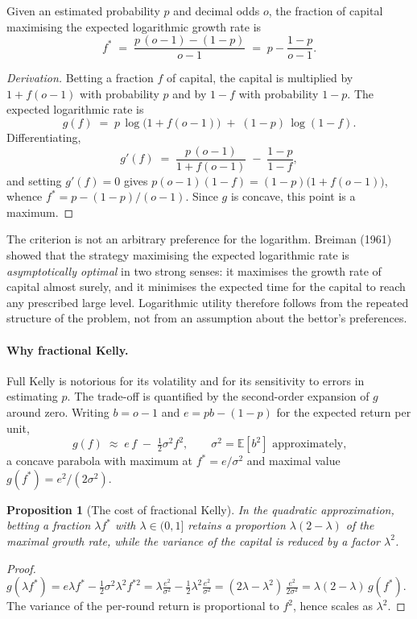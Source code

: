 \documentclass[12pt,a4paper,oneside]{report}
\renewcommand{\_}{\oldunderscore\allowbreak}
\theoremstyle{definition}
\theoremstyle{plain}
\newtheorem{proposition}[theorem]{Proposition}
\theoremstyle{remark}
\begin{document}
Given an estimated probability $p$ and decimal odds $o$, the fraction of capital maximising the
expected logarithmic growth rate is
\[
f^{*} \;=\; \frac{p\,(o-1) - (1-p)}{o-1} \;=\; p - \frac{1-p}{o-1}.
\]
\begin{proof}[Derivation]
Betting a fraction $f$ of capital, the capital is multiplied by $1+f(o-1)$ with probability $p$
and by $1-f$ with probability $1-p$. The expected logarithmic rate is
\[
g(f) \;=\; p\,\log\big(1+f(o-1)\big) \;+\; (1-p)\,\log(1-f).
\]
Differentiating,
\[
g'(f) \;=\; \frac{p\,(o-1)}{1+f(o-1)} \;-\; \frac{1-p}{1-f},
\]
and setting $g'(f)=0$ gives $p(o-1)(1-f) = (1-p)\big(1+f(o-1)\big)$, whence
$f^{*} = p - (1-p)/(o-1)$. Since $g$ is concave, this point is a maximum.
\end{proof}

The criterion is not an arbitrary preference for the logarithm. Breiman (1961) showed that the
strategy maximising the expected logarithmic rate is \emph{asymptotically optimal} in two strong
senses: it maximises the growth rate of capital almost surely, and it minimises the expected time
for the capital to reach any prescribed large level. Logarithmic utility therefore follows from
the repeated structure of the problem, not from an assumption about the bettor's preferences.

\paragraph{Why fractional Kelly.} Full Kelly is notorious for its volatility and for its
sensitivity to errors in estimating $p$. The trade-off is quantified by the second-order
expansion of $g$ around zero. Writing $b=o-1$ and $e = pb-(1-p)$ for the expected return per
unit,
\[
g(f) \;\approx\; e\,f \;-\; \tfrac12 \sigma^2 f^2, \qquad \sigma^2 = \mathbb{E}[b^2] \text{ approximately,}
\]
a concave parabola with maximum at $f^{*}=e/\sigma^2$ and maximal value
$g(f^{*}) = e^2/(2\sigma^2)$.

\begin{proposition}[The cost of fractional Kelly]
\label{prop:fractional-kelly}
In the quadratic approximation, betting a fraction $\lambda f^{*}$ with $\lambda\in(0,1]$ retains
a proportion $\lambda(2-\lambda)$ of the maximal growth rate, while the variance of the capital
is reduced by a factor $\lambda^2$.
\end{proposition}

\begin{proof}
$g(\lambda f^{*}) = e\lambda f^{*} - \tfrac12\sigma^2\lambda^2 f^{*2}
= \lambda \frac{e^2}{\sigma^2} - \tfrac12 \lambda^2 \frac{e^2}{\sigma^2}
= (2\lambda-\lambda^2)\, \frac{e^2}{2\sigma^2} = \lambda(2-\lambda)\, g(f^{*})$.
The variance of the per-round return is proportional to $f^2$, hence scales as $\lambda^2$.
\end{proof}
\end{document}
